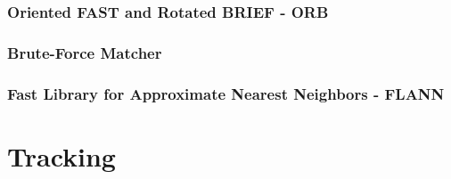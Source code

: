 \subsubsection{Oriented FAST and Rotated BRIEF - ORB}

\subsubsection{Brute-Force Matcher}
\subsubsection{Fast Library for Approximate Nearest Neighbors - FLANN}

\section{Tracking}
